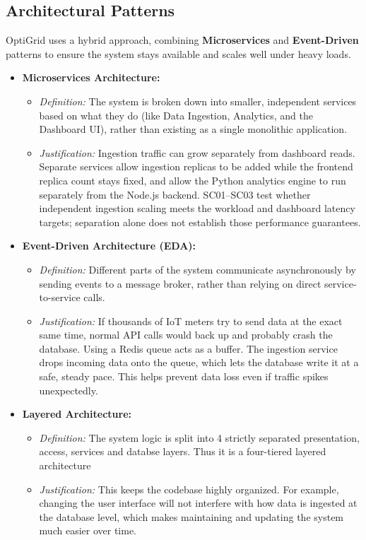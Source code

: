 \documentclass[12pt, a4paper]{article}
\begin{document}
\subsection{Architectural Patterns}
OptiGrid uses a hybrid approach, combining \textbf{Microservices} and \textbf{Event-Driven} patterns to ensure the system stays available and scales well under heavy loads.

\begin{itemize}
    \item \textbf{Microservices Architecture:} 
    \begin{itemize}
        \item \textit{Definition:} The system is broken down into smaller, independent services based on what they do (like Data Ingestion, Analytics, and the Dashboard UI), rather than existing as a single monolithic application.
        \item \textit{Justification:} Ingestion traffic can grow separately from dashboard reads. Separate services allow ingestion replicas to be added while the frontend replica count stays fixed, and allow the Python analytics engine to run separately from the Node.js backend. SC01--SC03 test whether independent ingestion scaling meets the workload and dashboard latency targets; separation alone does not establish those performance guarantees.
    \end{itemize}
    \item \textbf{Event-Driven Architecture (EDA):}
    \begin{itemize}
        \item \textit{Definition:} Different parts of the system communicate asynchronously by sending events to a message broker, rather than relying on direct service-to-service calls.
        \item \textit{Justification:} If thousands of IoT meters try to send data at the exact same time, normal API calls would back up and probably crash the database. Using a Redis queue acts as a buffer. The ingestion service drops incoming data onto the queue, which lets the database write it at a safe, steady pace. This helps prevent data loss even if traffic spikes unexpectedly.
    \end{itemize}
    \item \textbf{Layered Architecture:}
    \begin{itemize}
        \item \textit{Definition:} The system logic is split into 4 strictly separated presentation, access, services and databse layers. Thus it is a four-tiered layered architecture
        \item \textit{Justification:} This keeps the codebase highly organized. For example, changing the user interface will not interfere with how data is ingested at the database level, which makes maintaining and updating the system much easier over time.
    \end{itemize}
\end{itemize}
\end{document}

